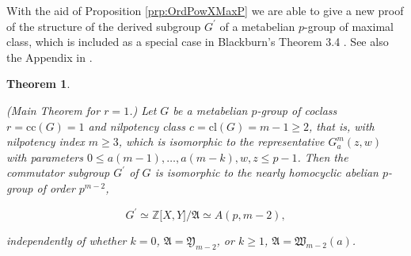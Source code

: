 \documentclass{amsart}
\newtheorem{theorem}{Theorem}[section]
\theoremstyle{definition}
\numberwithin{equation}{section}
\begin{document}
\noindent
With the aid of Proposition
\ref{prp:OrdPowXMaxP}
we are able to give a new proof of the structure of the derived subgroup \(G^\prime\)
of a metabelian \(p\)-group of maximal class,
which is included as a special case in Blackburn's Theorem 3.4
\cite[p. 68]{Bl}.
See also the Appendix in
\cite[p. 456]{Ma3}.

\begin{theorem}
\label{thm:ComSbgMaxP}

(Main Theorem for \(r=1\).)
Let \(G\) be a metabelian \(p\)-group of coclass \(r=\mathrm{cc}(G)=1\)
and nilpotency class \(c=\mathrm{cl}(G)=m-1\ge 2\), that is, with nilpotency index \(m\ge 3\),
which is isomorphic to the representative \(G_a^m(z,w)\) with parameters \(0\le a(m-1),\ldots,a(m-k),w,z\le p-1\).
Then the commutator subgroup \(G^\prime\) of \(G\)
is isomorphic to the nearly homocyclic abelian \(p\)-group of order \(p^{m-2}\),

\begin{equation}
\label{eqn:ComSbgMaxP}
G^\prime\simeq\mathbb{Z}\lbrack X,Y\rbrack/\mathfrak{A}\simeq A(p,m-2),
\end{equation}

\noindent
independently of whether \(k=0\), \(\mathfrak{A}=\mathfrak{Y}_{m-2}\), or \(k\ge 1\), \(\mathfrak{A}=\mathfrak{W}_{m-2}(a)\).

\end{theorem}
\end{document}
